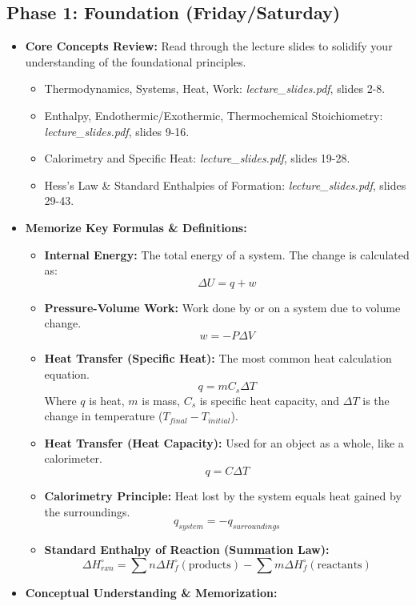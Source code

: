 \documentclass{article}
\begin{document}
\subsection{Phase 1: Foundation (Friday/Saturday)}
\begin{itemize}
    \item \textbf{Core Concepts Review:} Read through the lecture slides to solidify your understanding of the foundational principles.
    \begin{itemize}
        \item Thermodynamics, Systems, Heat, Work: \textit{lecture\_slides.pdf}, slides 2-8.
        \item Enthalpy, Endothermic/Exothermic, Thermochemical Stoichiometry: \textit{lecture\_slides.pdf}, slides 9-16.
        \item Calorimetry and Specific Heat: \textit{lecture\_slides.pdf}, slides 19-28.
        \item Hess's Law \& Standard Enthalpies of Formation: \textit{lecture\_slides.pdf}, slides 29-43.
    \end{itemize}
    \item \textbf{Memorize Key Formulas \& Definitions:}
    \begin{itemize}
        \item \textbf{Internal Energy:} The total energy of a system. The change is calculated as:
        \[ \Delta U = q + w \]
        \item \textbf{Pressure-Volume Work:} Work done by or on a system due to volume change.
        \[ w = -P\Delta V \]
        \item \textbf{Heat Transfer (Specific Heat):} The most common heat calculation equation.
        \[ q = mC_s\Delta T \]
        Where $q$ is heat, $m$ is mass, $C_s$ is specific heat capacity, and $\Delta T$ is the change in temperature ($T_{final} - T_{initial}$).
        \item \textbf{Heat Transfer (Heat Capacity):} Used for an object as a whole, like a calorimeter.
        \[ q = C\Delta T \]
        \item \textbf{Calorimetry Principle:} Heat lost by the system equals heat gained by the surroundings.
        \[ q_{system} = -q_{surroundings} \]
        \item \textbf{Standard Enthalpy of Reaction (Summation Law):}
        \[ \Delta H_{rxn}^\circ = \sum n\Delta H_f^\circ(\text{products}) - \sum m\Delta H_f^\circ(\text{reactants}) \]
    \end{itemize}
    \item \textbf{Conceptual Understanding \& Memorization:}

\end{itemize}
\end{document}
